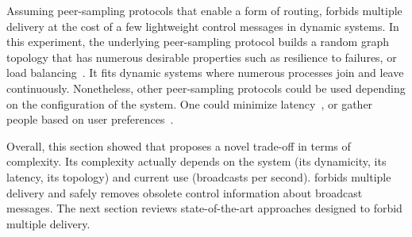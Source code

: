 

\noindent Assuming peer-sampling protocols that enable a form of routing,
\RPCBROADCAST forbids multiple delivery at the cost of a few lightweight control
messages in dynamic systems. In this experiment, the underlying peer-sampling
protocol builds a random graph topology that has numerous desirable properties
such as resilience to failures, or load balancing~\cite{jelasity2007gossip}. It
fits dynamic systems where numerous processes join and leave
continuously. Nonetheless, other peer-sampling protocols could be used depending
on the configuration of the system.
One could minimize latency~\cite{dabek2004vivaldi}, or gather people based on 
user preferences~\cite{jelasity2009tman}.





Overall, this section showed that \RPCBROADCAST proposes a novel trade-off in
terms of complexity. Its complexity actually depends on the system (its
dynamicity, its latency, its topology) and current use (broadcasts per second).
\RPCBROADCAST forbids multiple delivery and safely removes obsolete control
information about broadcast messages. The next section reviews state-of-the-art
approaches designed to forbid multiple delivery.




